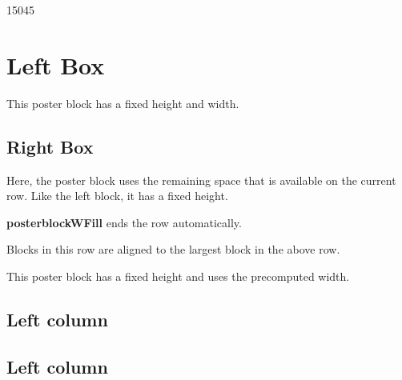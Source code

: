\documentclass[a4paper, 11pt]{article}
\begin{document}
\begin{poster}
  \begin{posterrows}[3]

    \begin{posterblockW}{150}{45}
      \section{Left Box}
      This poster block has a fixed height and width.
    \end{posterblockW}

    \begin{posterblockWFill}{45}
      \section{Right Box}
      Here, the poster block uses the remaining space that is available on the current row.
      Like the left block, it has a fixed height.
    \end{posterblockWFill}

    \begin{posterblock}
      {\bf posterblockWFill} ends the row automatically.
    \end{posterblock}

    \begin{posterblock}
      Blocks in this row are aligned to the largest block in the above row.
    \end{posterblock}

    \begin{posterblockH}{30}
      This poster block has a fixed height and uses the precomputed width.
    \end{posterblockH}

  \end{posterrows}

  \begin{postercolumns}[3]
    \begin{posterblock}
      \section{Left column}
    \end{posterblock}
    \begin{posterblock}
      \section{Left column}
    \end{posterblock}

    \posternextcolumn
    \posternextcolumn


\end{postercolumns}
\end{poster}
\end{document}
